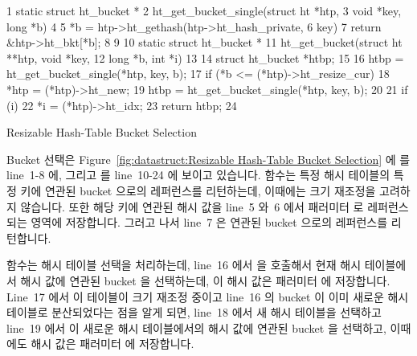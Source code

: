 \begin{listing}[tb]
{ \scriptsize
\begin{verbbox}
 1 static struct ht_bucket *
 2 ht_get_bucket_single(struct ht *htp,
 3                      void *key, long *b)
 4 {
 5   *b = htp->ht_gethash(htp->ht_hash_private,
 6                        key) %
 7   return &htp->ht_bkt[*b];
 8 }
 9 
10 static struct ht_bucket *
11 ht_get_bucket(struct ht **htp, void *key,
12               long *b, int *i)
13 {
14   struct ht_bucket *htbp;
15 
16   htbp = ht_get_bucket_single(*htp, key, b);
17   if (*b <= (*htp)->ht_resize_cur) {
18     *htp = (*htp)->ht_new;
19     htbp = ht_get_bucket_single(*htp, key, b);
20   }
21   if (i)
22     *i = (*htp)->ht_idx;
23   return htbp;
24 }
\end{verbbox}
}
\centering
\theverbbox
\caption{Resizable Hash-Table Bucket Selection}
\label{lst:datastruct:Resizable Hash-Table Bucket Selection}
\end{listing}

Bucket 선택은
Figure~\ref{fig:datastruct:Resizable Hash-Table Bucket Selection} 에
 를 line~1-8 에, 그리고
 를 line~10-24 에 보이고 있습니다.
 함수는 특정 해시 테이블의 특정 키에 연관된 bucket
으로의 레퍼런스를 리턴하는데, 이때에는 크기 재조정을 고려하지 않습니다.
또한 해당 키에 연관된 해시 값을 line~5 와~6 에서 패러미터  로
레퍼런스되는 영역에 저장합니다.
그러고 나서 line~7 은 연관된 bucket 으로의 레퍼런스를 리턴합니다.

 함수는 해시 테이블 선택을 처리하는데, line~16 에서
 을 호출해서 현재 해시 테이블에서 해시 값에 연관된
bucket 을 선택하는데, 이 해시 값은 패러미터  에 저장합니다.
Line~17 에서 이 테이블이 크기 재조정 중이고 line~16 의 bucket 이 이미 새로운
해시 테이블로 분산되었다는 점을 알게 되면, line~18 에서 새 해시 테이블을
선택하고 line~19 에서 이 새로운 해시 테이블에서의 해시 값에 연관된 bucket 을
선택하고, 이때에도 해시 값은 패러미터  에 저장합니다.
\iffalse

